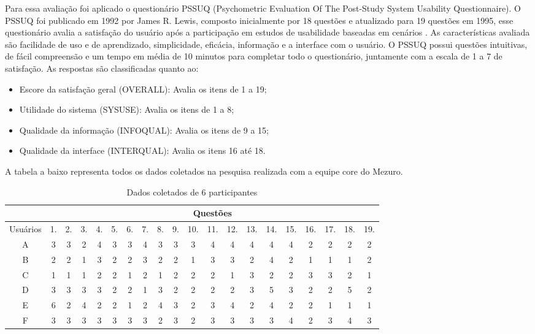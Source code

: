 Para essa avaliação foi aplicado o questionário PSSUQ (Psychometric Evaluation Of The Post-Study System Usability Questionnaire). O PSSUQ foi publicado em 1992 por James R. Lewis, composto inicialmente por 18 questões e atualizado para 19 questões em 1995, esse questionário avalia a satisfação do usuário após a participação em estudos de usabilidade baseadas em cenários \cite{lewis1992}. As características avaliada são facilidade de uso e de aprendizado, simplicidade, eficácia, informação e a interface com o usuário. O PSSUQ possui questões intuitivas, de fácil compreensão e um tempo em média de 10 minutos para completar todo o questionário, juntamente com a escala de 1 a 7 de satisfação. As respostas são classificadas quanto ao:
\begin{itemize}
\item Escore da satisfação geral (OVERALL): Avalia os itens de 1 a 19;
\item Utilidade do sistema (SYSUSE): Avalia os itens de 1 a 8;
\item Qualidade da informação (INFOQUAL): Avalia os itens de 9 a 15;
\item Qualidade da interface (INTERQUAL): Avalia os itens 16 até 18.
\end{itemize}

A tabela a baixo representa todos os dados coletados na pesquisa realizada com a equipe core do Mezuro.

\begin{table}[H]
\begin{tabular}{|c|c|c|c|c|c|c|c|c|c|c|c|c|c|c|c|c|c|c|c|}
\hline
\multicolumn{1}{|l|}{} & \multicolumn{19}{c|}{Questões}                                                                         \\ \hline
Usuários& 1. & 2. & 3. & 4. & 5. & 6. & 7. & 8. & 9. & 10. & 11. & 12. & 13. & 14. & 15. & 16. & 17. & 18. & 19. \\ \hline
A                      & 3  & 3  & 2  & 4  & 3  & 3  & 4  & 3  & 3  & 3   & 4   & 4   & 4   & 4   & 4   & 2   & 2   & 2   & 2   \\ \hline
B                      & 2  & 2  & 1  & 3  & 2  & 2  & 3  & 2  & 2  & 1   & 3   & 3   & 2   & 4   & 2   & 1   & 1   & 1   & 2   \\ \hline
C                      & 1  & 1  & 1  & 2  & 2  & 1  & 2  & 1  & 2  & 2   & 2   & 1   & 3   & 2   & 2   & 3   & 3   & 2   & 1   \\ \hline
D                      & 3  & 3  & 3  & 3  & 2  & 2  & 1  & 3  & 2  & 2   & 2   & 2   & 3   & 5   & 3   & 2   & 2   & 5   & 2   \\ \hline
E                      & 6  & 2  & 4  & 2  & 2  & 1  & 2  & 4  & 3  & 2   & 3   & 4   & 2   & 4   & 2   & 2   & 1   & 1   & 1   \\ \hline
F                      & 3  & 3  & 3  & 3  & 3  & 3  & 3  & 2  & 3  & 2   & 3   & 3   & 3   & 3   & 4   & 2   & 3   & 4   & 3   \\ \hline
\end{tabular}
\caption{Dados coletados de 6 participantes}
\end{table}

